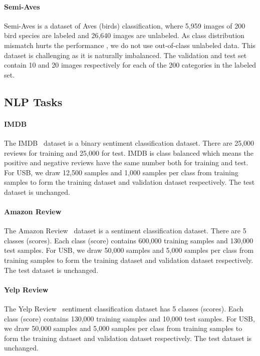 \documentclass{article}
\begin{document}
\paragraph{Semi-Aves}
Semi-Aves \cite{su2021semi} is a dataset of Aves (birds) classification, where 5,959 images of 200 bird species are labeled and 26,640 images are unlabeled. 
As class distribution mismatch hurts the performance \cite{saito2021openmatch}, we do not use out-of-class unlabeled data.
This dataset is challenging as it is naturally imbalanced.
The validation and test set contain 10 and 20 images respectively for each of the 200 categories in the labeled set.


\subsection{NLP Tasks}
\label{sec-details-usb-nlp}

\paragraph{IMDB}
The IMDB~\cite{maas2011learning} dataset is a binary sentiment classification dataset. There are 25,000 reviews for training and 25,000 for test. IMDB is class balanced which means the positive and negative reviews have the same number both for training and test. For USB, we draw 12,500 samples and 1,000 samples per class from training samples to form the training dataset and validation dataset respectively. The test dataset is unchanged.

\paragraph{Amazon Review}
The Amazon Review~\cite{mcauley2013hidden} dataset is a sentiment classification dataset. There are 5 classes (scores). Each class (score) contains 600,000 training samples and 130,000 test samples. For USB, we draw 50,000 samples and 5,000 samples per class from training samples to form the training dataset and validation dataset respectively. The test dataset is unchanged.

\paragraph{Yelp Review}
The Yelp Review~\cite{yelpwebsite} sentiment classification dataset has 5 classes (scores). Each class (score) contains 130,000 training samples and 10,000 test samples. For USB, we draw 50,000 samples and 5,000 samples per class from training samples to form the training dataset and validation dataset respectively. The test dataset is unchanged.
\end{document}
